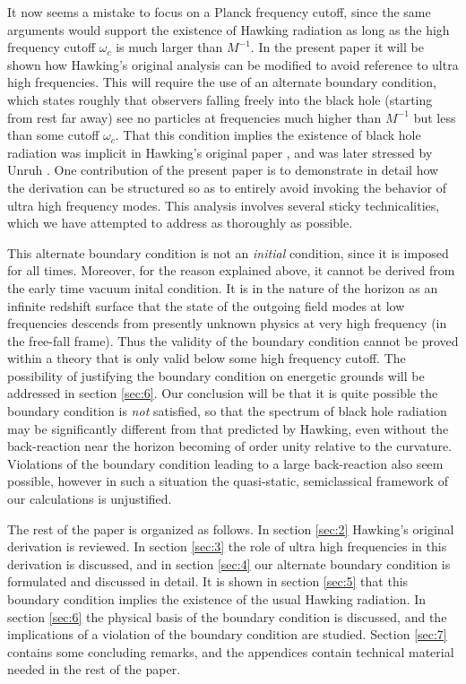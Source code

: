 \documentclass[12pt]{article}
\begin{document}
It now seems a mistake to focus on a Planck frequency
cutoff, since the same arguments would support the existence
of Hawking radiation as long as the high frequency  cutoff
$\omega_c$ is much larger than $M^{-1}$.
In the present paper it will be shown how Hawking's original
analysis can be modified to avoid reference to ultra high
frequencies. This will require the use of an alternate
boundary condition, which states roughly that observers
falling freely into the black hole (starting from rest
far away) see no particles at frequencies much higher than
$M^{-1}$ but less than some cutoff $\omega_c$.
That this condition implies the existence of
black hole radiation was implicit in Hawking's original
paper \cite{Hawk75}, and was later stressed by Unruh \cite{Origin}.
One contribution of the present paper is to demonstrate
in detail how the derivation can be structured so as to
entirely avoid invoking the behavior of ultra high
frequency modes. This analysis involves several sticky technicalities,
which we have attempted to address as thoroughly as possible.

This alternate boundary condition is not an {\it initial}
condition, since it is imposed for all times. Moreover, for
the reason explained above, it cannot be derived from the
early time vacuum inital condition. It is in the nature of the
horizon as an infinite redshift surface that the state of
the outgoing field modes at low frequencies descends from
presently unknown physics at very high frequency (in the
free-fall frame). Thus the validity of
the boundary condition cannot be proved within a theory that
is only valid below some high frequency cutoff.
The possibility of justifying the boundary condition on
energetic grounds will be addressed in section \ref{sec:6}.
Our conclusion will be that it is quite possible the
boundary condition is {\it not} satisfied, so that the
spectrum of black hole radiation may be significantly
different from that predicted by Hawking, even without the
back-reaction near the horizon becoming of order unity relative
to the curvature. Violations of the boundary condition leading
to a large back-reaction also seem possible, however in such
a situation the quasi-static, semiclassical framework of
our calculations is unjustified.

The rest of the paper is organized as follows. In section
\ref{sec:2}
Hawking's original derivation is reviewed. In section
\ref{sec:3} the
role of ultra high frequencies in this derivation is
discussed, and in section \ref{sec:4}
our alternate boundary condition
is formulated and discussed in detail. It is shown in
section \ref{sec:5}
that this boundary condition implies the existence
of the usual Hawking radiation. In section \ref{sec:6} the
physical basis of the boundary condition is discussed, and the
implications of a violation of the boundary condition are studied.
Section \ref{sec:7} contains some concluding remarks, and
the appendices contain technical material needed in
the rest of the paper.
\end{document}

